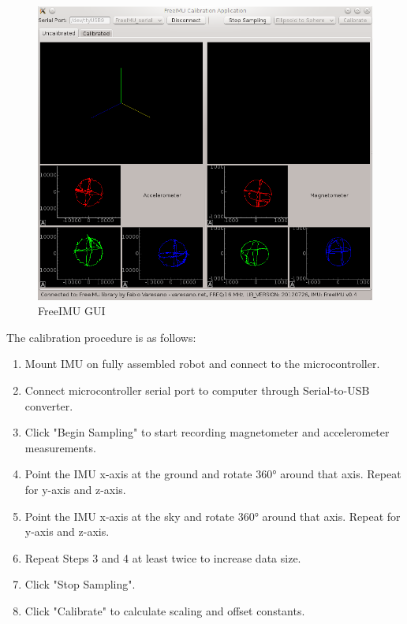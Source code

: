 \begin{figure}[H]   %
	\centering \includegraphics[width=6in, keepaspectratio]{figures/cal_gui.png}
	\caption{FreeIMU GUI \cite{freeimu}}\label{fig:cal_gui}
\end{figure}

The calibration procedure is as follows:
\begin{enumerate}
	\item \ssp Mount IMU on fully assembled robot and connect to the microcontroller.
	\item \ssp Connect microcontroller serial port to computer through Serial-to-USB converter.
	\item \ssp Click "Begin Sampling" to start recording magnetometer and accelerometer measurements.
	\item \ssp Point the IMU x-axis at the ground and rotate \ang{360} around that axis. Repeat for y-axis and z-axis.
	\item \ssp Point the IMU x-axis at the sky and rotate \ang{360} around that axis. Repeat for y-axis and z-axis.
	\item \ssp Repeat Steps 3 and 4 at least twice to increase data size.
	\item \ssp Click "Stop Sampling".
	\item \ssp Click "Calibrate" to calculate scaling and offset constants.
\end{enumerate}

